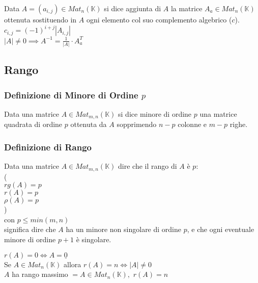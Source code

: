 \documentclass[a4paper, twoside, italian, 11pt]{book}
\newcommand{\K}{\mathbb{K}}
\begin{document}
Data $A = (a_{i,j}) \in Mat_n(\K)$ si dice aggiunta di $A$ la matrice $A_a \in Mat_n(\K)$ ottenuta sostituendo in $A$ ogni elemento col suo complemento algebrico ($c$). \\

\noindent
$c_{i,j} = (-1)^{i+j} \left | A_{i,j} \right |$ \\

\noindent
$\left | A \right | \neq 0 \implies A^{-1} = \frac{1}{\left | A \right |} \cdot A_a^T$


\subsection{Rango}


\subsubsection{Definizione di Minore di Ordine $p$}

Data una matrice $A \in Mat_{m,n}(\K)$ si dice minore di ordine $p$ una matrice quadrata di ordine $p$ ottenuta da $A$ sopprimendo $n-p$ colonne e $m-p$ righe.

\subsubsection{Definizione di Rango}

Data una matrice $A \in Mat_{m,n}(\K)$ dire che il rango di $A$ è $p$: \\

\noindent
( \\
$rg(A) = p$ \\
$r(A) = p$ \\
$\rho(A) = p$ \\
) \\

\noindent
con $p \leq min(m, n)$ \\

\noindent
significa dire che $A$ ha un minore non singolare di ordine $p$, e che ogni eventuale minore di ordine $p + 1$ è singolare.

\noindent
$r(A) = 0 \iff A = \underline{0}$ \\

\noindent
Se $A \in Mat_n(\K)$ allora $r(A) = n \iff \left | A \right | \neq 0$ \\

\noindent
$A$ ha rango massimo $= A \in Mat_n(\K),$ $r(A) = n$ \\
\end{document}
